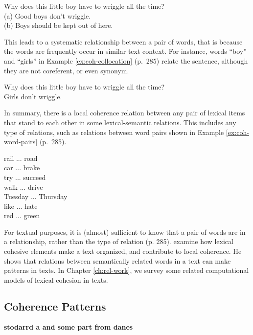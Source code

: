 \begin{examples}
	\label{ex:coh-nonref}
	Why does this little boy have to wriggle all the time? \\
	(a) Good boys don't wriggle. \\
	(b) Boys should be kept out of here. \\
\end{examples} 

This leads to a systematic relationship between a pair of words, that is because the words are frequently occur in similar text context. 
For instance, words ``boy'' and ``girls'' in Example \ref{ex:coh-collocation} \cite{halliday76}(p.~285) relate the sentence, although they are not coreferent, or even synonym. 

\begin{examples}
	\label{ex:coh-collocation}
	Why does this little boy have to wriggle all the time? \\
	Girls don't wriggle. 
\end{examples}

In summary, there is a local coherence relation between any pair of lexical items that stand to each other in some lexical-semantic relations. 
This includes any type of relations, such as relations between word pairs shown in Example \ref{ex:coh-word-pairs} \cite{halliday76} (p.~285). 

\begin{examples}
	\label{ex:coh-word-pairs}
	rail ... road \\
	car ... brake \\
	try ... succeed \\
	walk ... drive \\
	Tuesday ... Thursday \\
	like ... hate \\
	red ... green 
\end{examples}

For textual purposes, it is (almost) sufficient to know that a pair of words are in a relationship, rather than the type of relation \cite{halliday76} (p. 285).  
 examine how lexical cohesive elements make a text organized, and contribute to local coherence. 
He shows that relations between semantically related words in a text can make patterns in texts. 
In Chapter \ref{ch:rel-work}, we survey some related computational models of lexical cohesion in texts. 

\subsection{Coherence Patterns}
\textbf{stodarrd a and some part from danes}

